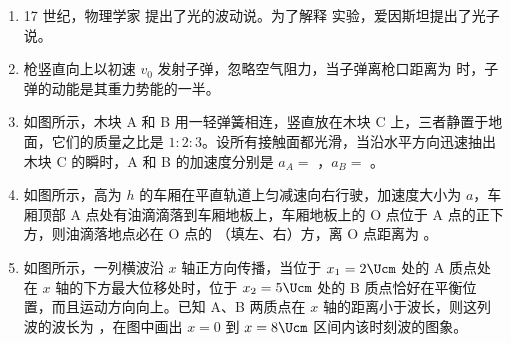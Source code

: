 \documentclass[\gkver]{gaokaozhenti}
\begin{document}
\begin{enumerate}
\item
17 世纪，物理学家  提出了光的波动说。为了解释  实验，爱因斯坦提出了光子说。

\item
枪竖直向上以初速 $v_{0}$ 发射子弹，忽略空气阻力，当子弹离枪口距离为  时，子弹的动能是其重力势能的一半。

\item
如图所示，木块 A 和 B 用一轻弹簧相连，竖直放在木块 C 上，三者静置于地面，它们的质量之比是 $1:2:3$。设所有接触面都光滑，当沿水平方向迅速抽出木块 C 的瞬时，A 和 B 的加速度分别是 $a_{A} =$ ，$a_{B} =$ 。
\onepicture[align=right]{}

\item
如图所示，高为 $h$ 的车厢在平直轨道上匀减速向右行驶，加速度大小为 $a$，车厢顶部 A 点处有油滴滴落到车厢地板上，车厢地板上的 O 点位于 A 点的正下方，则油滴落地点必在 O 点的 （填左、右）方，离 O 点距离为 。
\onepicture[align=right]{}

\item
如图所示，一列横波沿 $x$ 轴正方向传播，当位于 $x_{1} = 2\Ucm$ 处的 A 质点处在 $x$ 轴的下方最大位移处时，位于 $x_{2} = 5\Ucm$ 处的 B 质点恰好在平衡位置，而且运动方向向上。已知 A、B 两质点在 $x$ 轴的距离小于波长，则这列波的波长为 \tkanswer[1.8cm]{$4\Ucm$}，在图中画出 $x = 0$ 到 $x = 8\Ucm$ 区间内该时刻波的图象。
\onepicture[align=right]{}
\jdanswer{
\begin{enumerate}
	\item
	$4\Ucm$


\end{enumerate}}
\end{enumerate}
\end{document}
